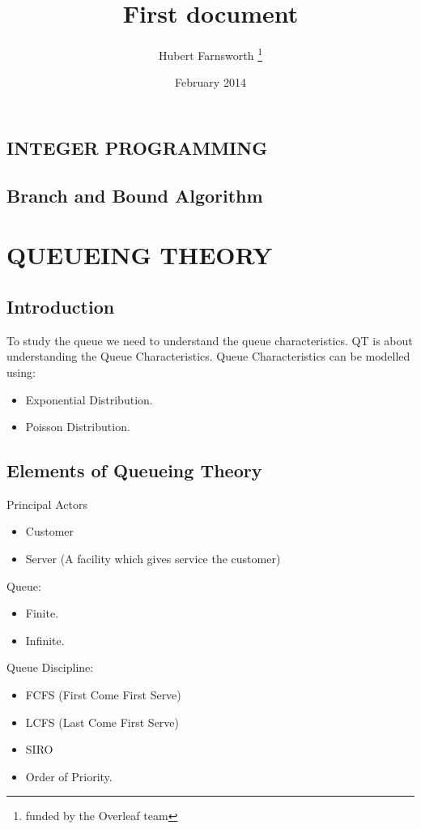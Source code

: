 \documentclass[12pt, letterpaper]{article}
\title{First document}
\author{Hubert Farnsworth \thanks{funded by the Overleaf team}}
\date{February 2014}
\begin{document}
\tableofcontents
\newpage
\begin{center}
\section{INTEGER PROGRAMMING}
\subsection{ Branch and Bound Algorithm }
\end{center}


\section{QUEUEING THEORY}
\subsection{Introduction}
To study the queue we need to understand the queue characteristics.
QT is about understanding the Queue Characteristics.
Queue Characteristics can be modelled using:

\begin{itemize}
    \item Exponential Distribution.
    \item Poisson Distribution.
\end{itemize}

\subsection{Elements of Queueing Theory}
 Principal Actors
\begin{itemize}
    \item Customer
    \item Server (A facility which gives service the customer)
\end{itemize}

Queue:
\begin{itemize}
    \item Finite.
    \item Infinite.
\end{itemize}

Queue Discipline:
\begin{itemize}
    \item FCFS (First Come First Serve)
    \item LCFS (Last Come First Serve)
    \item SIRO
    \item Order of Priority.
\end{itemize}
\end{document}
